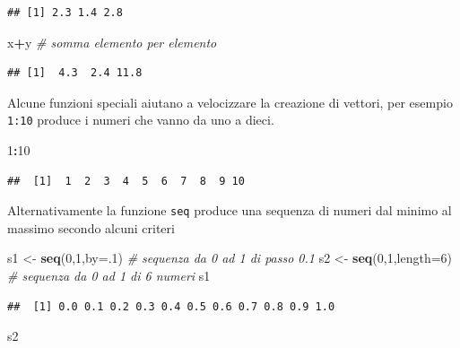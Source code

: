 \documentclass[
  11pt,
]{book}
\newenvironment{Shaded}{\begin{snugshade}}{\end{snugshade}}
\newcommand{\AttributeTok}[1]{\textcolor[rgb]{0.13,0.29,0.53}{#1}}
\newcommand{\CommentTok}[1]{\textcolor[rgb]{0.56,0.35,0.01}{\textit{#1}}}
\newcommand{\DecValTok}[1]{\textcolor[rgb]{0.00,0.00,0.81}{#1}}
\newcommand{\FunctionTok}[1]{\textcolor[rgb]{0.13,0.29,0.53}{\textbf{#1}}}
\newcommand{\NormalTok}[1]{#1}
\newcommand{\OtherTok}[1]{\textcolor[rgb]{0.56,0.35,0.01}{#1}}
\newcommand{\SpecialCharTok}[1]{\textcolor[rgb]{0.81,0.36,0.00}{\textbf{#1}}}
\theoremstyle{mytheoremstyle}
\theoremstyle{mydefstyle}
\begin{document}
\begin{verbatim}
## [1] 2.3 1.4 2.8
\end{verbatim}

\begin{Shaded}
\begin{Highlighting}[]
\NormalTok{x}\SpecialCharTok{+}\NormalTok{y }\CommentTok{\# somma elemento per elemento}
\end{Highlighting}
\end{Shaded}

\begin{verbatim}
## [1]  4.3  2.4 11.8
\end{verbatim}

Alcune funzioni speciali aiutano a velocizzare la creazione di vettori, per
esempio \texttt{1:10} produce i numeri che vanno da uno a dieci.

\begin{Shaded}
\begin{Highlighting}[]
\DecValTok{1}\SpecialCharTok{:}\DecValTok{10}
\end{Highlighting}
\end{Shaded}

\begin{verbatim}
##  [1]  1  2  3  4  5  6  7  8  9 10
\end{verbatim}

Alternativamente la funzione \texttt{seq} produce una sequenza di numeri dal minimo al massimo
secondo alcuni criteri

\begin{Shaded}
\begin{Highlighting}[]
\NormalTok{s1 }\OtherTok{\textless{}{-}} \FunctionTok{seq}\NormalTok{(}\DecValTok{0}\NormalTok{,}\DecValTok{1}\NormalTok{,}\AttributeTok{by=}\NormalTok{.}\DecValTok{1}\NormalTok{)     }\CommentTok{\# sequenza da 0 ad 1 di passo 0.1}
\NormalTok{s2 }\OtherTok{\textless{}{-}} \FunctionTok{seq}\NormalTok{(}\DecValTok{0}\NormalTok{,}\DecValTok{1}\NormalTok{,}\AttributeTok{length=}\DecValTok{6}\NormalTok{)  }\CommentTok{\# sequenza da 0 ad 1 di 6 numeri}
\NormalTok{s1}
\end{Highlighting}
\end{Shaded}

\begin{verbatim}
##  [1] 0.0 0.1 0.2 0.3 0.4 0.5 0.6 0.7 0.8 0.9 1.0
\end{verbatim}

\begin{Shaded}
\begin{Highlighting}[]
\NormalTok{s2}
\end{Highlighting}
\end{Shaded}
\end{document}
